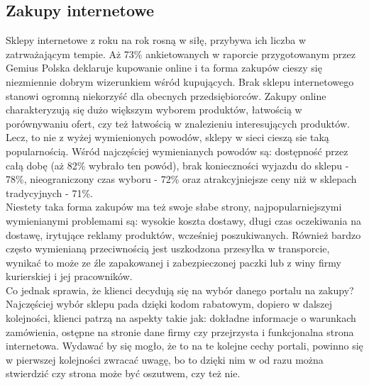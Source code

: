 \documentclass[12pt]{article}
\begin{document}
\begin{sloppypar}
{  \subsection{Zakupy internetowe}
  {
    Sklepy internetowe z roku na rok rosną w siłę, przybywa ich liczba w zatrważającym tempie. 
    Aż 73\% ankietowanych w raporcie przygotowanym przez Gemius Polska\cite{gemius-report} deklaruje kupowanie online i ta forma zakupów cieszy się niezmiennie dobrym 
    wizerunkiem wśród kupujących. Brak sklepu internetowego stanowi ogromną niekorzyść dla obecnych przedsiębiorców. 
    Zakupy online charakteryzują się dużo większym wyborem produktów, łatwością w porównywaniu ofert, czy też łatwością w znalezieniu interesujących produktów. 
    Lecz, to nie z wyżej wymienionych powodów, sklepy w sieci cieszą sie taką popularnością.
    Wśród najczęściej wymienianych powodów są: dostępność przez całą dobę (aż 82\% wybrało ten powód), brak konieczności wyjazdu do sklepu - 78\%, 
    nieograniczony czas wyboru - 72\% oraz atrakcyjniejsze ceny niż w sklepach tradycyjnych - 71\%.\\
    Niestety taka forma zakupów ma też swoje słabe strony, najpopularniejszymi
    wymienianymi problemami są: wysokie koszta dostawy, długi czas oczekiwania na dostawę, irytujące reklamy produktów, wcześniej poszukiwanych.
    Również bardzo często wymienianą przeciwnością jest uszkodzona przesyłka w transporcie, wynikać to może ze źle zapakowanej i zabezpieczonej paczki lub z winy 
    firmy kurierskiej i jej pracowników.\\
    Co jednak sprawia, że klienci decydują się na wybór danego portalu na zakupy?\\
    Najczęściej wybór sklepu pada dzięki kodom rabatowym, dopiero w dalszej kolejności, klienci patrzą na aspekty takie jak:
    dokładne informacje o warunkach zamówienia, ostępne na stronie dane firmy czy przejrzysta i funkcjonalna strona internetowa. 
    Wydawać by się mogło, że to na te kolejne cechy portali, powinno się w pierwszej kolejności
    zwracać uwagę, bo to dzięki nim w od razu można stwierdzić czy strona może być oszutwem, czy też nie.
    }
}
\end{sloppypar}
\end{document}
